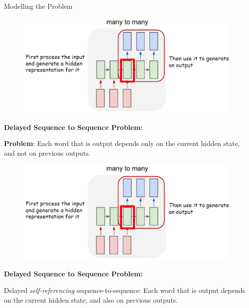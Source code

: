 \begin{frame}[allowframebreaks]{Modelling the Problem}
    \begin{figure}
        \centering
        \includegraphics[width=\linewidth, height=0.7\textheight,keepaspectratio]{images/nlp/problem-modelling.png}
    \end{figure}

    \textbf{Delayed Sequence to Sequence Problem:}

    \textbf{Problem}: Each word that is output depends only on the current hidden state, and not on previous outputs.

    \framebreak

    \begin{figure}
        \centering
        \includegraphics[width=\linewidth, height=0.7\textheight,keepaspectratio]{images/nlp/problem-modelling.png}
    \end{figure}

    \textbf{Delayed Sequence to Sequence Problem:}

    Delayed \textit{self-referencing} sequence-to-sequence: Each word that is output depends on the current hidden state, and also on previous outputs.

\end{frame}

